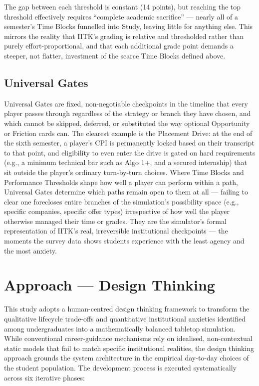 The gap between each threshold is constant (14 points), but reaching the top threshold effectively requires ``complete academic sacrifice'' --- nearly all of a semester's Time Blocks funnelled into Study, leaving little for anything else. This mirrors the reality that IITK's grading is relative and thresholded rather than purely effort-proportional, and that each additional grade point demands a steeper, not flatter, investment of the scarce Time Blocks defined above.

\subsection*{Universal Gates}
\label{sec:universal-gates}

Universal Gates are fixed, non-negotiable checkpoints in the timeline that every player passes through regardless of the strategy or branch they have chosen, and which cannot be skipped, deferred, or substituted the way optional Opportunity or Friction cards can. The clearest example is the Placement Drive: at the end of the sixth semester, a player's CPI is permanently locked based on their transcript to that point, and eligibility to even enter the drive is gated on hard requirements (e.g., a minimum technical bar such as Algo 1+, and a secured internship) that sit outside the player's ordinary turn-by-turn choices. Where Time Blocks and Performance Thresholds shape how well a player can perform within a path, Universal Gates determine which paths remain open to them at all --- failing to clear one forecloses entire branches of the simulation's possibility space (e.g., specific companies, specific offer types) irrespective of how well the player otherwise managed their time or grades. They are the simulator's formal representation of IITK's real, irreversible institutional checkpoints --- the moments the survey data shows students experience with the least agency and the most anxiety.

\section{Approach --- Design Thinking}
\label{sec:approach}

This study adopts a human-centred design thinking framework to transform the qualitative lifecycle trade-offs and quantitative institutional anxieties identified among undergraduates into a mathematically balanced tabletop simulation. While conventional career-guidance mechanisms rely on idealised, non-contextual static models that fail to match specific institutional realities, the design thinking approach grounds the system architecture in the empirical day-to-day choices of the student population. The development process is executed systematically across six iterative phases:

